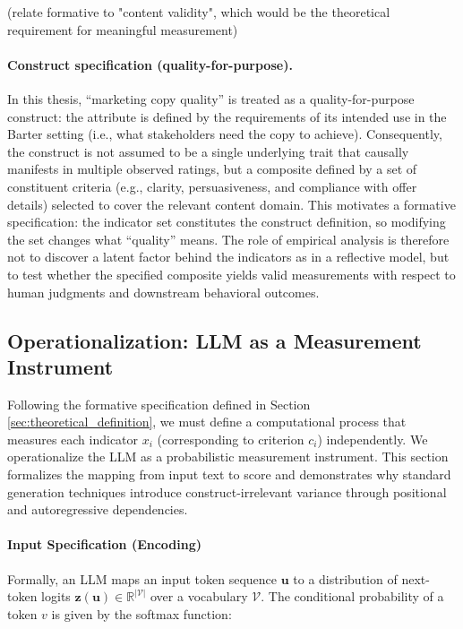 (relate formative to "content validity", which would be the theoretical requirement for meaningful measurement)


\paragraph{Construct specification (quality-for-purpose).} In this thesis, “marketing copy quality” is treated as a quality-for-purpose construct: the attribute is defined by the requirements of its intended use in the Barter setting (i.e., what stakeholders need the copy to achieve). Consequently, the construct is not assumed to be a single underlying trait that causally manifests in multiple observed ratings, but a composite defined by a set of constituent criteria (e.g., clarity, persuasiveness, and compliance with offer details) selected to cover the relevant content domain. This motivates a formative specification: the indicator set constitutes the construct definition, so modifying the set changes what “quality” means. The role of empirical analysis is therefore not to discover a latent factor behind the indicators as in a reflective model, but to test whether the specified composite yields valid measurements with respect to human judgments and downstream behavioral outcomes.

\subsection{Operationalization: LLM as a Measurement Instrument}\label{sec:operationalization}

Following the formative specification defined in Section \ref{sec:theoretical_definition}, we must define a computational process that measures each indicator $x_i$ (corresponding to criterion $c_i$) independently. We operationalize the LLM as a probabilistic measurement instrument. This section formalizes the mapping from input text to score and demonstrates why standard generation techniques introduce construct-irrelevant variance through positional and autoregressive dependencies.

\paragraph{Input Specification (Encoding)}
Formally, an LLM maps an input token sequence $\mathbf{u}$ to a distribution of next-token logits $\mathbf{z}(\mathbf{u}) \in \mathbb{R}^{|\mathcal{V}|}$ over a vocabulary $\mathcal{V}$. The conditional probability of a token $v$ is given by the softmax function:

